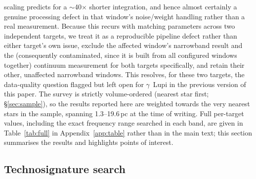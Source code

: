 \documentclass{openjournal}
\begin{document}
scaling predicts for a $\sim$40$\times$ shorter integration, and hence
almost certainly a genuine processing defect in that window's
noise/weight handling rather than a real measurement. Because this
recurs with matching parameters across two independent targets, we treat
it as a reproducible pipeline defect rather than either target's own
issue, exclude the affected window's narrowband result and the
(consequently contaminated, since it is built from all configured
windows together) continuum measurement for both targets specifically,
and retain their other, unaffected narrowband windows. This resolves, for
these two targets, the data-quality question flagged but left open for
$\gamma$~Lupi in the previous version of this paper. The survey is
strictly volume-ordered (nearest star first; \S\ref{sec:sample}), so the
results reported here are weighted towards the very nearest stars in the
sample, spanning 1.3--19.6\,pc at the time of writing. Full per-target
values, including the exact frequency range searched in each band, are
given in Table~\ref{tab:full} in Appendix~\ref{app:table} rather than in
the main text; this section summarises the results and highlights points
of interest.

\subsection{Technosignature search}
\end{document}
